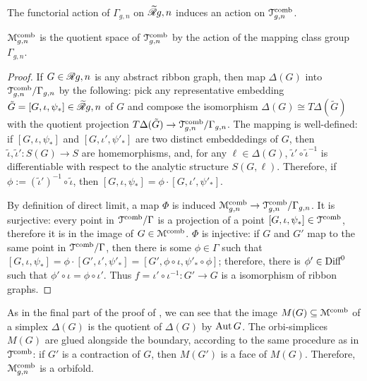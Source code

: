 The functorial action of $\Gamma_{g,n}$ on $\mathscr{\widetilde R}_{}{g,n}$ induces an action
on $\mathcal{T}\sp{\text{comb}}_{g,n}$.
\begin{lemma}
  \label{lemma:penner-kontsevich-bridge}
  $\mathcal{M}\sp{\text{comb}}_{g,n}$ is the quotient space of $\mathcal{T}\sp{\text{comb}}_{g,n}$ by the action
  of the mapping class group $\Gamma_{g,n}$.%
\end{lemma}
\begin{proof}
  If $G \in \mathscr{R}_{}{g,n}$ is any abstract ribbon graph, then map $\Delta(G)$ into
  $\mathcal{T}\sp{\text{comb}}_{g,n} / \Gamma_{g,n}$ by the following: pick any representative
  embedding ${\tilde G} = [G, \iota, \psi_*] \in \mathscr{\widetilde R}_{}{g,n}$ of $G$ and compose
  the isomorphism $\Delta(G) \cong T\Delta(\tilde G)$ with the quotient projection
  $T\Delta(\tilde G) \to \mathcal{T}\sp{\text{comb}}_{g,n}/\Gamma_{g,n}$.  The mapping is well-defined:
  if $[G, \iota, \psi_*]$ and $[G, \iota', \psi'_*]$ are two distinct embeddedings
  of $G$, then ${\tilde \iota}, {\tilde \iota'}: S(G) \to S$ are homemorphisms,
  and, for any $\ell \in \Delta(G)$, ${\tilde \iota'} \circ {\tilde \iota}^{-1}$ is
  differentiable with respect to the analytic structure $S(G, \ell)$.
  Therefore, if $\phi := ({\tilde \iota}')^{-1} \circ {\tilde \iota}$, then $[G, \iota,
  \psi_*] = \phi \cdot [G, \iota', \psi'_*]$.

  By definition of direct limit, a map $\Phi$ is induced $\mathcal{M}\sp{\text{comb}}_{g,n} \to
  \mathcal{T}\sp{\text{comb}}_{g,n} / \Gamma_{g,n}$.  It is surjective: every point in $\mathcal{T}\sp{\text{comb}} /
  \Gamma$ is a projection of a point $[G, \iota, \psi_*] \in \mathcal{T}\sp{\text{comb}}$, therefore it
  is in the image of $G \in \mathcal{M}\sp{\text{comb}}$.  $\Phi$ is injective: if $G$ and $G'$
  map to the same point in $\mathcal{T}\sp{\text{comb}} / \Gamma$, then there is some $\phi \in \Gamma$
  such that $[G, \iota, \psi_*] = \phi \cdot [G', \iota', \psi'_*] = [G', \phi \circ \iota, \psi'_* \circ
  \phi]$; therefore, there is $\phi' \in \textrm{Diff}^0$ such that $\phi' \circ \iota = \phi \circ \iota'$.
  Thus $f = \iota' \circ \iota^{-1}: G' \to G$ is a isomorphism of ribbon
  graphs.
\end{proof}

As in the final part of the proof of
, we can see that the image
$M(G) \subseteq \mathcal{M}\sp{\text{comb}}$ of a simplex $\Delta(G)$ is the quotient of $\Delta(G)$ by $\operatorname{Aut}
G$.  The orbi-simplices $M(G)$ are glued alongside the boundary,
according to the same procedure as in $\mathcal{T}\sp{\text{comb}}$: if $G'$ is a
contraction of $G$, then $M(G')$ is a face of $M(G)$. Therefore,
$\mathcal{M}\sp{\text{comb}}_{g,n}$ is a orbifold.

